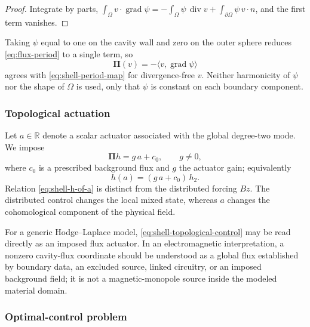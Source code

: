 \documentclass{article}
\DeclareMathOperator{\divergence}{div}
\newcommand{\R} {\mathbb R}
\newcommand{\Piop}{\boldsymbol\Pi}
\newcommand{\ip}[2]{\langle #1,#2\rangle}
\begin{document}
\begin{proof}
Integrate by parts,
$\int_\Omega v\cdot\operatorname{grad}\psi
=-\int_\Omega\psi\,\divergence v+\int_{\partial\Omega}\psi\,v\cdot n$,
and the first term vanishes.
\end{proof}
 
Taking $\psi$ equal to one on the cavity wall and zero on the outer
sphere reduces \eqref{eq:flux-period} to a single term, so
\begin{equation}\label{eq:shell-period-potential}
  \Piop(v)=-\ip{v}{\operatorname{grad}\psi}
\end{equation}
agrees with \eqref{eq:shell-period-map} for divergence-free $v$.
Neither harmonicity of $\psi$ nor the shape of $\Omega$ is used, only
that $\psi$ is constant on each boundary component.
 
\subsubsection{Topological actuation}
\label{sec:shell-actuation}
 
Let $a\in\R$ denote a scalar actuator associated with the global
degree-two mode. We impose
\begin{equation}\label{eq:shell-topological-control}
  \Piop h=g\,a+c_0,\qquad g\neq0,
\end{equation}
where $c_0$ is a prescribed background flux and $g$ the actuator gain;
equivalently
\begin{equation}\label{eq:shell-h-of-a}
  h(a)=(g\,a+c_0)\,h_2 .
\end{equation}
Relation \eqref{eq:shell-h-of-a} is distinct from the distributed
forcing $Bz$. The
distributed control changes the local mixed state, whereas $a$ changes
the cohomological component of the physical field.
 
For a generic Hodge--Laplace model,
\eqref{eq:shell-topological-control} may be read directly as an imposed
flux actuator. In an electromagnetic interpretation, a nonzero
cavity-flux coordinate should be understood as a global flux
established by boundary data, an excluded source, linked circuitry, or
an imposed background field; it is not a magnetic-monopole source
inside the modeled material domain.
 
\subsubsection{Optimal-control problem}
\label{sec:shell-ocp}
 
\end{document}
